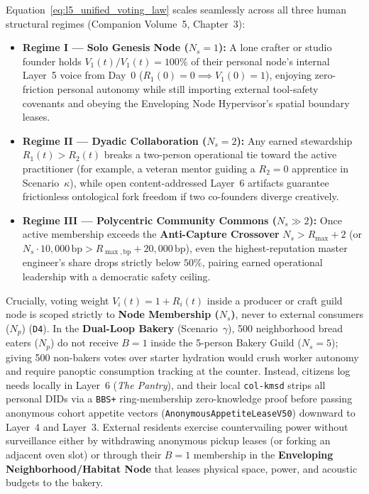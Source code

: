 Equation~\eqref{eq:l5_unified_voting_law} scales seamlessly across all three human structural regimes (Companion Volume~5, Chapter~3):
\begin{itemize}
  \item \textbf{Regime I --- Solo Genesis Node ($N_s = 1$):} A lone crafter or studio founder holds $V_1(t) / V_1(t) = 100\%$ of their personal node's internal Layer~5 voice from Day~0 ($R_1(0) = 0 \implies V_1(0) = 1$), enjoying zero-friction personal autonomy while still importing external tool-safety covenants and obeying the Enveloping Node Hypervisor's spatial boundary leases.
  \item \textbf{Regime II --- Dyadic Collaboration ($N_s = 2$):} Any earned stewardship $R_1(t) > R_2(t)$ breaks a two-person operational tie toward the active practitioner (for example, a veteran mentor guiding a $R_2 = 0$ apprentice in Scenario~$\kappa$), while open content-addressed Layer~6 artifacts guarantee frictionless ontological fork freedom if two co-founders diverge creatively.
  \item \textbf{Regime III --- Polycentric Community Commons ($N_s \gg 2$):} Once active membership exceeds the \textbf{Anti-Capture Crossover} $N_s > R_{\max} + 2$ (or $N_s \cdot 10{,}000\,\mathrm{bp} > R_{\max,\mathrm{bp}} + 20{,}000\,\mathrm{bp}$), even the highest-reputation master engineer's share drops strictly below $50\%$, pairing earned operational leadership with a democratic safety ceiling.
\end{itemize}

Crucially, voting weight $V_i(t) = 1 + R_i(t)$ inside a producer or craft guild node is scoped strictly to \textbf{Node Membership ($N_s$)}, never to external consumers ($N_p$) (\texttt{D4}). In the \textbf{Dual-Loop Bakery} (Scenario~$\gamma$), 500 neighborhood bread eaters ($N_p$) do not receive $B=1$ inside the 5-person Bakery Guild ($N_s = 5$); giving 500 non-bakers votes over starter hydration would crush worker autonomy and require panoptic consumption tracking at the counter. Instead, citizens log needs locally in Layer~6 (\textit{The Pantry}), and their local \texttt{col-kmsd} strips all personal DIDs via a \texttt{BBS+} ring-membership zero-knowledge proof before passing anonymous cohort appetite vectors (\texttt{AnonymousAppetiteLeaseV50}) downward to Layer~4 and Layer~3. External residents exercise countervailing power without surveillance either by withdrawing anonymous pickup leases (or forking an adjacent oven slot) or through their $B=1$ membership in the \textbf{Enveloping Neighborhood/Habitat Node} that leases physical space, power, and acoustic budgets to the bakery.


